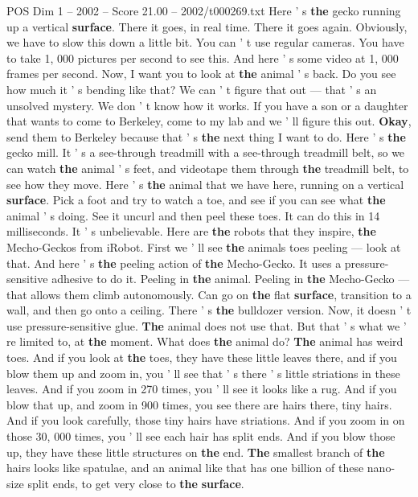 \begin{textsample}{POS Dim 1 – 2002 – Score 21.00 – 2002/t000269.txt}
Here ' s \textbf{the} gecko running up a vertical \textbf{surface}.
There it goes, in real time.
There it goes again.
Obviously, we have to slow this down a little bit.
You can ' t use regular cameras.
You have to take 1, 000 pictures per second to see this.
And here ' s some video at 1, 000 frames per second.
Now, I want you to look at \textbf{the} animal ' s back.
Do you see how much it ' s bending like that?
We can ' t figure that out — that ' s an unsolved mystery.
We don ' t know how it works.
If you have a son or a daughter that wants to come to Berkeley, come to my lab and we ' ll figure this out. \textbf{Okay}, send them to Berkeley because that ' s \textbf{the} next thing I want to do.
Here ' s \textbf{the} gecko mill.
It ' s a see-through treadmill with a see-through treadmill belt, so we can watch \textbf{the} animal ' s feet, and videotape them through \textbf{the} treadmill belt, to see how they move.
Here ' s \textbf{the} animal that we have here, running on a vertical \textbf{surface}.
Pick a foot and try to watch a toe, and see if you can see what \textbf{the} animal ' s doing.
See it uncurl and then peel these toes.
It can do this in 14 milliseconds.
It ' s unbelievable.
Here are \textbf{the} robots that they inspire, \textbf{the} Mecho-Geckos from iRobot.
First we ' ll see \textbf{the} animals toes peeling — look at that.
And here ' s \textbf{the} peeling action of \textbf{the} Mecho-Gecko.
It uses a pressure- sensitive adhesive to do it.
Peeling in \textbf{the} animal.
Peeling in \textbf{the} Mecho-Gecko — that allows them climb autonomously.
Can go on \textbf{the} flat \textbf{surface}, transition to a wall, and then go onto a ceiling.
There ' s \textbf{the} bulldozer version.
Now, it doesn ' t use pressure-sensitive glue. \textbf{The} animal does not use that.
But that ' s what we ' re limited to, at \textbf{the} moment.
What does \textbf{the} animal do? \textbf{The} animal has weird toes.
And if you look at \textbf{the} toes, they have these little leaves there, and if you blow them up and zoom in, you ' ll see that ' s there ' s little striations in these leaves.
And if you zoom in 270 times, you ' ll see it looks like a rug.
And if you blow that up, and zoom in 900 times, you see there are hairs there, tiny hairs.
And if you look carefully, those tiny hairs have striations.
And if you zoom in on those 30, 000 times, you ' ll see each hair has split ends.
And if you blow those up, they have these little structures on \textbf{the} end. \textbf{The} smallest branch of \textbf{the} hairs looks like spatulae, and an animal like that has one billion of these nano-size split ends, to get very close to \textbf{the} \textbf{surface}.

\end{textsample}
